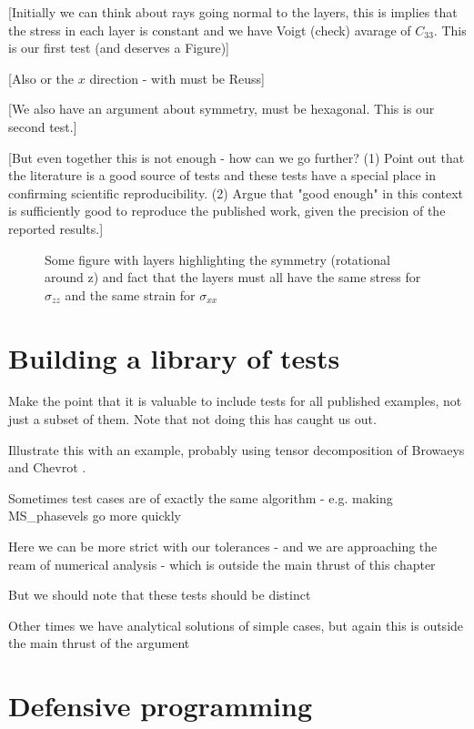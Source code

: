\documentclass[11pt, oneside]{article}   	%
\begin{document}
[Initially we can think about rays going normal to the layers, this is 
implies that the stress in each layer is constant and we have Voigt (check)
avarage of $C_{33}$. This is our first test (and deserves a Figure)]

[Also or the $x$ direction - with must be Reuss]

[We also have an argument about symmetry, must be hexagonal. This is our
second test.]

[But even together this is not enough - how can we go further?
(1) Point out that the literature is a good source of tests and these
tests have a special place in confirming scientific reproducibility.
(2) Argue that "good enough" in this context is sufficiently good to 
reproduce the published work, given the precision of the reported results.]

\begin{figure}[htbp]
   \centering
   \caption{Some figure with layers highlighting the symmetry (rotational around z) 
                 and fact that the layers must all have the same stress for $\sigma_{zz}$
                 and the same strain for $\sigma_{xx}$}
   \label{fig:backus}
\end{figure}

\section{Building a library of tests}

Make the point that it is valuable to include tests for all published
examples, not just a subset of them. Note that not doing this has caught
us out. 

Illustrate this with an example, probably using tensor decomposition 
of Browaeys and Chevrot \cite{Browaeys2004}.

Sometimes test cases are of exactly the same algorithm - e.g. making
MS\_phasevels go more quickly

Here we can be more strict with our tolerances - and we are approaching 
the ream of numerical analysis - which is outside the main thrust of this chapter

But we should note that these tests should be distinct

Other times we have analytical solutions of simple cases, but again this is 
outside the main thrust of the argument

\section{Defensive programming}
\end{document}
